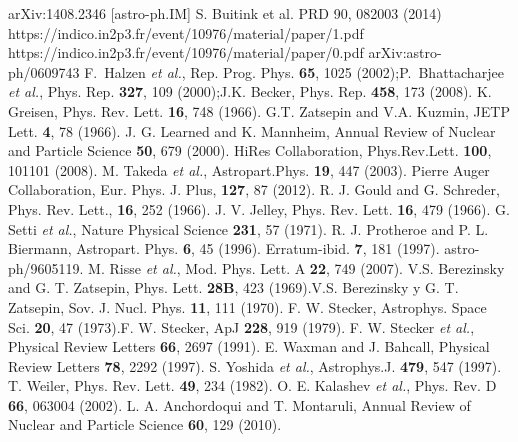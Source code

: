 \begin{thebibliography}{1}
 arXiv:1408.2346 [astro-ph.IM]
 S. Buitink et al. PRD 90, 082003 (2014)
 https://indico.in2p3.fr/event/10976/material/paper/1.pdf
 https://indico.in2p3.fr/event/10976/material/paper/0.pdf
 arXiv:astro-ph/0609743
F.~Halzen {\it et al.}, Rep. Prog. Phys. {\bf 65}, 1025 (2002);\newline P.~Bhattacharjee {\it et al.}, Phys. Rep. {\bf 327}, 109 (2000);\newline J.K. Becker, Phys. Rep. {\bf 458}, 173 (2008). 
 K. Greisen, Phys. Rev. Lett. \textbf{16}, 748 (1966).
 G.T. Zatsepin and V.A. Kuzmin, JETP Lett. \textbf{4}, 78 (1966).
 J. G. Learned and K. Mannheim, Annual Review of Nuclear and Particle Science \textbf{50}, 679 (2000).
 HiRes Collaboration, Phys.Rev.Lett. \textbf{100}, 101101 (2008).
  M. Takeda {\it et al.}, Astropart.Phys. \textbf{19}, 447 (2003).
 Pierre Auger Collaboration, Eur. Phys. J. Plus, \textbf{127}, 87 (2012).
 R. J. Gould and G. Schreder, Phys. Rev. Lett., \textbf{16}, 252 (1966).
  J. V. Jelley, Phys. Rev. Lett. \textbf{16}, 479 (1966).
 G. Setti {\it et al.}, Nature Physical Science \textbf{231}, 57 (1971).
 R. J. Protheroe and P. L. Biermann, Astropart. Phys. \textbf{6}, 45 (1996). Erratum-ibid. \textbf{7}, 181 (1997). astro-ph/9605119.
 M. Risse {\it et al.}, Mod. Phys. Lett. A \textbf{22}, 749 (2007).
 V.S. Berezinsky and G. T. Zatsepin, Phys. Lett. {\bf 28B}, 423 (1969).\newline V.S. Berezinsky y G. T. Zatsepin, Sov. J. Nucl. Phys. {\bf 11}, 111 (1970).
 F. W. Stecker, Astrophys. Space Sci. {\bf 20}, 47 (1973).\newline F. W. Stecker, ApJ {\bf 228}, 919 (1979).
 F. W. Stecker  {\it et al.}, Physical Review Letters \textbf{66}, 2697 (1991).
 E. Waxman and J. Bahcall,  Physical Review Letters \textbf{78}, 2292 (1997).
 S. Yoshida {\it et al.}, Astrophys.J. \textbf{479}, 547 (1997).
 T. Weiler,  Phys. Rev. Lett. \textbf{49}, 234 (1982).
  O. E. Kalashev {\it et al.}, Phys. Rev. D \textbf{66}, 063004 (2002).
 L. A. Anchordoqui and T. Montaruli, Annual Review of Nuclear and Particle Science \textbf{60}, 129 (2010).

\end{thebibliography}
